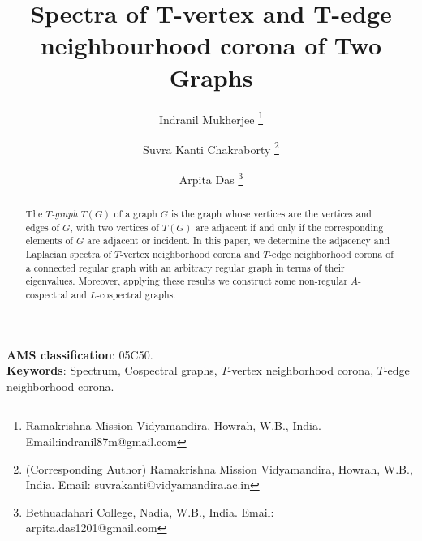\documentclass[a4paper,12pt]{article}
\title{Spectra of T-vertex and T-edge neighbourhood corona of Two Graphs}
\author{Indranil Mukherjee \thanks{ Ramakrishna Mission Vidyamandira, Howrah, W.B., India. Email:indranil87m@gmail.com} \and Suvra Kanti Chakraborty \thanks{(Corresponding Author) Ramakrishna Mission Vidyamandira, Howrah, W.B., India. Email: suvrakanti@vidyamandira.ac.in} \and  Arpita Das  \thanks{Bethuadahari College, Nadia, W.B., India. Email: arpita.das1201@gmail.com}  }
\date{}
\begin{document}
\maketitle
\begin{abstract}
The \textit{$T$-graph} $T(G)$ of a graph $G$ is the graph whose vertices are the vertices and edges of $G$, with two vertices of $T(G)$ are adjacent if and only if the corresponding elements of $G$ are adjacent or incident. In this paper, we determine the adjacency and Laplacian spectra of $T$-vertex neighborhood corona and $T$-edge neighborhood corona of a connected regular graph with an arbitrary regular graph in terms of their eigenvalues. Moreover, applying these results we construct some non-regular $A$-cospectral and $L$-cospectral graphs.
\end{abstract}
\textbf{AMS classification}: 05C50.\\
\textbf{Keywords}: Spectrum, Cospectral graphs, $T$-vertex neighborhood corona, $T$-edge neighborhood corona.
\end{document}
